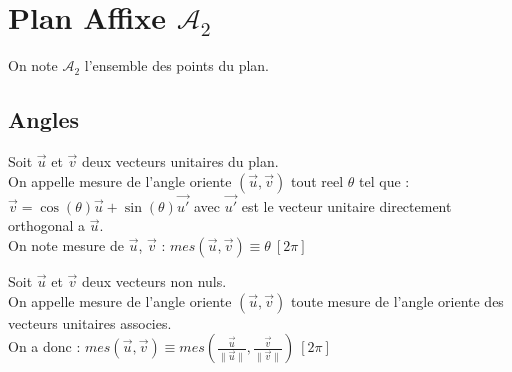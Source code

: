 \documentclass[12pt,twoside,a4paper]{article}
\author{MPSI 2}
\begin{document}
	\maketitle

	\section{Plan Affixe $\mathcal{A}_2$}
		On note $\mathcal{A}_2$ l'ensemble des points du plan.

		\subsection{Angles}
			\begin{defi}
				Soit $\vec{u}$ et $\vec{v}$ deux vecteurs unitaires du plan.\\
				On appelle  mesure de l'angle oriente $\left(\vec{u}, \vec{v}\right)$ tout reel $\theta$ tel que : $\vec{v} = \cos\left(\theta\right)\vec{u} + \sin\left(\theta\right)\vec{u'}$ avec $\vec{u'}$ est le vecteur unitaire directement orthogonal a $\vec{u}$.\\
				On note mesure de $\vec{u}$, $\vec{v}$ : $mes\left(\vec{u}, \vec{v}\right) \equiv \theta \ \left[2\pi\right]$
			\end{defi}
			\begin{defi}
				Soit $\vec{u}$ et $\vec{v}$ deux vecteurs non nuls.\\
				On appelle mesure de l'angle oriente $\left(\vec{u}, \vec{v}\right)$ toute mesure de l'angle oriente des vecteurs unitaires associes.\\
				On a donc : $mes\left(\vec{u}, \vec{v}\right) \equiv mes\left(\frac{\vec{u}}{\|\vec{u}\|}, \frac{\vec{v}}{\|\vec{v}\|}\right) \ \left[2\pi\right]$
			\end{defi}
		
\end{document}
